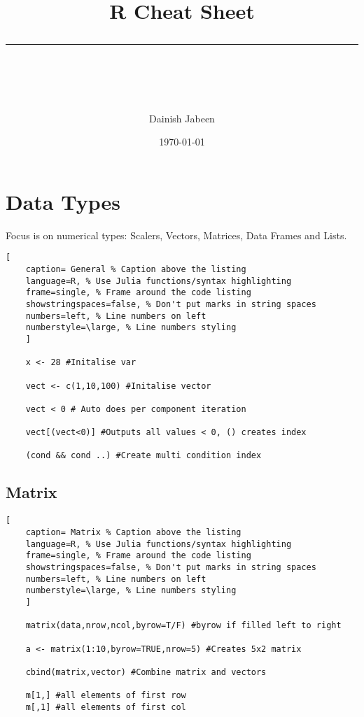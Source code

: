 \documentclass[11pt]{scrartcl} %
\title{	
	\normalfont\normalsize
	\vspace{20pt} %
	{\huge R Cheat Sheet}\\ %
	\vspace{12pt} %
	\rule{\linewidth}{2pt}\\ %
}
\author{\small Dainish Jabeen} %
\date{\normalsize\today} %
\begin{document}
\maketitle %

\section{Data Types}

Focus is on numerical types: Scalers, Vectors, Matrices, Data Frames and Lists.

\begin{lstlisting}[
	caption= General % Caption above the listing
	language=R, % Use Julia functions/syntax highlighting
	frame=single, % Frame around the code listing
	showstringspaces=false, % Don't put marks in string spaces
	numbers=left, % Line numbers on left
	numberstyle=\large, % Line numbers styling
	]

	x <- 28 #Initalise var

	vect <- c(1,10,100) #Initalise vector

	vect < 0 # Auto does per component iteration

	vect[(vect<0)] #Outputs all values < 0, () creates index

	(cond && cond ..) #Create multi condition index

\end{lstlisting}

\subsection{Matrix}

\begin{lstlisting}[
	caption= Matrix % Caption above the listing
	language=R, % Use Julia functions/syntax highlighting
	frame=single, % Frame around the code listing
	showstringspaces=false, % Don't put marks in string spaces
	numbers=left, % Line numbers on left
	numberstyle=\large, % Line numbers styling
	]

	matrix(data,nrow,ncol,byrow=T/F) #byrow if filled left to right

	a <- matrix(1:10,byrow=TRUE,nrow=5) #Creates 5x2 matrix 

	cbind(matrix,vector) #Combine matrix and vectors

	m[1,] #all elements of first row
	m[,1] #all elements of first col

\end{lstlisting}
\end{document}
